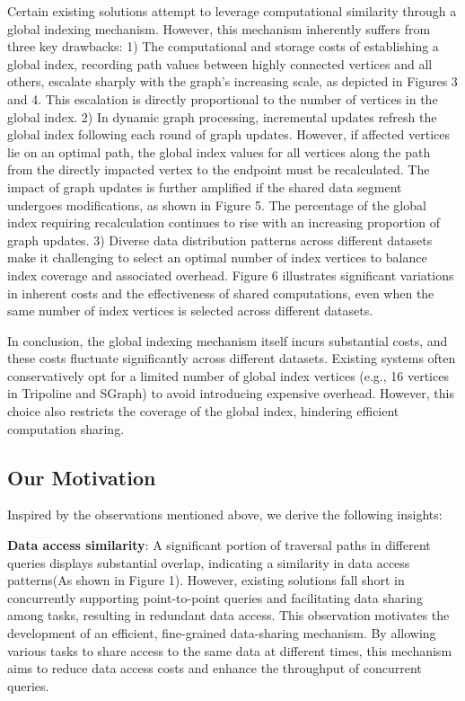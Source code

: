 \documentclass[lettersize,journal]{IEEEtran} %
\begin{document}
Certain existing solutions attempt to leverage computational similarity through a global indexing mechanism\cite{tripoline}\cite{sgraph}. However, this mechanism inherently suffers from three key drawbacks: 1) The computational and storage costs of establishing a global index, recording path values between highly connected vertices and all others, escalate sharply with the graph's increasing scale, as depicted in Figures 3 and 4. This escalation is directly proportional to the number of vertices in the global index. 2) In dynamic graph processing, incremental updates refresh the global index following each round of graph updates. However, if affected vertices lie on an optimal path, the global index values for all vertices along the path from the directly impacted vertex to the endpoint must be recalculated. The impact of graph updates is further amplified if the shared data segment undergoes modifications, as shown in Figure 5. The percentage of the global index requiring recalculation continues to rise with an increasing proportion of graph updates. 3) Diverse data distribution patterns across different datasets make it challenging to select an optimal number of index vertices to balance index coverage and associated overhead. Figure 6 illustrates significant variations in inherent costs and the effectiveness of shared computations, even when the same number of index vertices is selected across different datasets.

In conclusion, the global indexing mechanism itself incurs substantial costs, and these costs fluctuate significantly across different datasets. Existing systems often conservatively opt for a limited number of global index vertices (e.g., 16 vertices in Tripoline\cite{tripoline} and SGraph\cite{sgraph}) to avoid introducing expensive overhead. However, this choice also restricts the coverage of the global index, hindering efficient computation sharing.

\subsection{Our Motivation}
Inspired by the observations mentioned above, we derive the following insights:

{\bf{Data access similarity}}: A significant portion of traversal paths in different queries displays substantial overlap, indicating a similarity in data access patterns(As shown in Figure 1). However, existing solutions fall short in concurrently supporting point-to-point queries and facilitating data sharing among tasks, resulting in redundant data access. This observation motivates the development of an efficient, fine-grained data-sharing mechanism. By allowing various tasks to share access to the same data at different times, this mechanism aims to reduce data access costs and enhance the throughput of concurrent queries.
\end{document}

